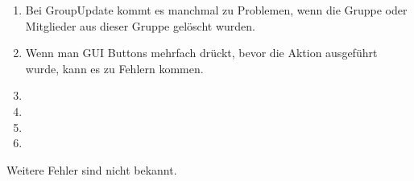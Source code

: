 \begin{enumerate}
	\item Bei GroupUpdate kommt es manchmal zu Problemen, wenn die Gruppe oder Mitglieder aus dieser Gruppe gelöscht wurden.
	\item Wenn man GUI Buttons mehrfach drückt, bevor die Aktion ausgeführt wurde, kann es zu Fehlern kommen.
	\item
	\item
	\item
	\item
\end{enumerate}

Weitere Fehler sind nicht bekannt.